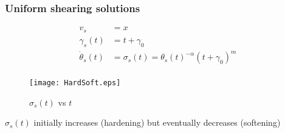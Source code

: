 \documentclass{beamer}
\begin{document}
\begin{frame}
\frametitle{Uniform shearing solutions}

{\small 
  \begin{align*}
     v_s  &= x \\
    \gamma_s (t)  &= t + \gamma_0 \\
     \dot \theta_s (t)  &= \sigma_s (t) =  {\theta_s (t) }^{-\alpha}(t+\gamma_0)^m
     \\
  \end{align*}



\vskip-1.2cm 

\begin{figure}
    \centering\texttt{[image: HardSoft.eps]}
    \caption{ $\sigma_s (t)$ \; vs \; $t$}
  \end{figure}
  \vskip-15pt
  $ \sigma_s (t)$ initially increases (hardening) but eventually decreases (softening) 

}

\end{frame}
\end{document}
